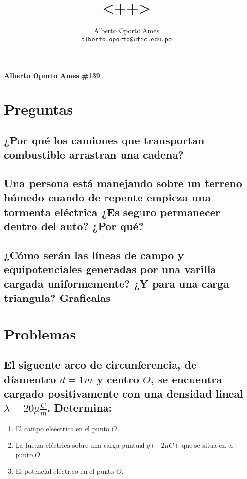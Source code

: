 \documentclass[12pt, twoside]{article}
\title{\textbf{<++>}}
\author{
		Alberto Oporto Ames\\
		\texttt{alberto.oporto@utec.edu.pe}\\
		}
\begin{document}
\textbf{Alberto Oporto Ames \#139}
\thispagestyle{fancy}

\section{Preguntas}%
\label{sec:Preguntas}

\subsection*{¿Por qué los camiones que transportan combustible arrastran una cadena?}%

\subsection*{Una persona está manejando sobre un terreno húmedo cuando de repente
empieza una tormenta eléctrica
¿Es seguro permanecer dentro del auto? ¿Por qué?}%

\subsection*{¿Cómo serán las líneas de campo y equipotenciales generadas por una
varilla cargada uniformemente? ¿Y para una carga triangula?
Graficalas}%


\section{Problemas}%
\label{sec:Problemas}
\subsection*{El siguente arco de circunferencia, de díamentro $d = 1m$ y centro $O$,
se encuentra cargado positivamente con una densidad lineal $\lambda = 20\mu \frac{C}{m}$.
Determina:}%
\begin{enumerate}[label=\textbf{\alph*)}]
	\item El campo eleéctrico en el punto $O$.
	\item La fuerza eléctrica sobre una carga puntual $q(-2\mu C)$ que se sitúa en el punto $O$.
	\item El potencial eléctrico en el punto $O$.
\end{enumerate}
\end{document}
